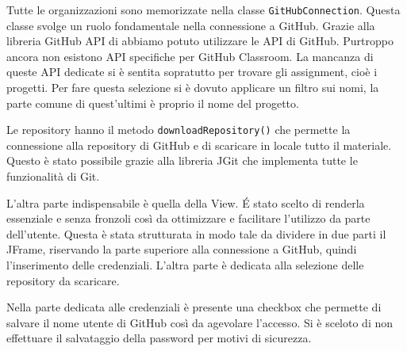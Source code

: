 		\begin{center}
			\label{img:GitHubClasses}
		\end{center}
		
		
		Tutte le organizzazioni sono memorizzate nella classe \verb|GitHubConnection|.
		Questa classe svolge un ruolo fondamentale nella connessione a GitHub. Grazie alla libreria GitHub API di \citep{GitHubAPI} abbiamo potuto utilizzare le API di GitHub.
		Purtroppo ancora non esistono API specifiche per GitHub Classroom. La mancanza di queste API dedicate si è sentita sopratutto per trovare gli assignment, cioè i progetti. Per fare questa selezione si è dovuto applicare un filtro sui nomi, la parte comune di quest'ultimi è proprio il nome del progetto.
		
		Le repository hanno il metodo \verb|downloadRepository()| che permette la connessione alla repository di GitHub e di scaricare in locale tutto il materiale. Questo è stato possibile grazie alla libreria JGit che implementa tutte le funzionalità di Git.
		
		L'altra parte indispensabile è quella della View.
		\'E stato scelto di renderla essenziale e senza fronzoli così da ottimizzare e facilitare l'utilizzo da parte dell'utente.
		Questa è stata strutturata in modo tale da dividere in due parti il JFrame, riservando la parte superiore alla connessione a GitHub, quindi l'inserimento delle credenziali. L'altra parte è dedicata alla selezione delle repository da scaricare.
		
		Nella parte dedicata alle credenziali è presente una checkbox che permette di salvare il nome utente di GitHub così da agevolare l'accesso. Si è sceloto di non effettuare il salvataggio della password per motivi di sicurezza.
		
